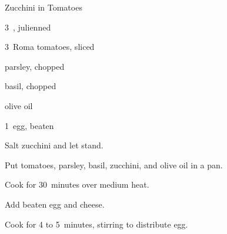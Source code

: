 \begin{recipe}{Zucchini in Tomatoes}{}{}

\begin{ingredients}
\item 3~, julienned
\item 3~Roma tomatoes, sliced
\item parsley, chopped
\item basil, chopped
\item olive oil
\item 1~egg, beaten
\item {}
\end{ingredients}

\begin{directions}
\item Salt zucchini and let stand.
\item Put tomatoes, parsley, basil, zucchini, and olive oil in a pan.
\item Cook for 30~minutes over medium heat.
\item Add beaten egg and cheese.
\item Cook for 4 to 5~minutes, stirring to distribute egg.
\end{directions}

\end{recipe}
